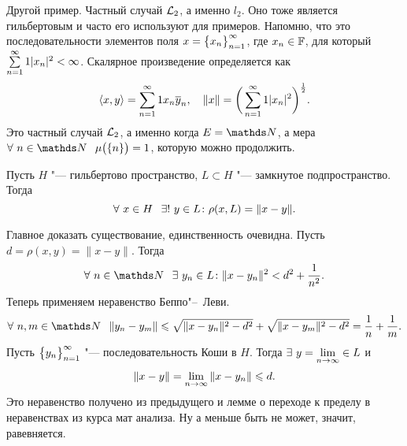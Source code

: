 Другой пример. Частный случай $\mathcal L_2$, а именно $l_2$. Оно тоже является гильбертовым и часто его используют для примеров. Напомню, что это последовательности элементов поля $x = \big\{{x}_{n}\big\}_{n=1}^\infty$, где $x_n\in \mathbb F$, для который $\sum\limits_{{n}={1}}^\infty1|x_n|^2<\infty$. Скалярное произведение определяется как
\[
  \langle x,y\rangle = \sum\limits_{{n}={1}}^\infty1 x_n\overline{y}_n,\quad \|x\| = \bigg(\sum\limits_{{n}={1}}^\infty1|x_n|^2\bigg)^{\frac12}.
\]
Это частный случай $\mathcal L_2$, а именно когда $E=\N$, а мера $\forall\ n\in\N\pau \mu\big(\{n\}\big) = 1$, которую можно продолжить.

\begin{The}
  Пусть $H$ "--- гильбертово пространство, $L\subset H$ "--- замкнутое подпространство. Тогда
\[
  \forall\ x\in H\pau \exists!\ y\in L\colon \rho(x,L) = \|x-y\|.
\]
\end{The}
\begin{Proof}
 Главное доказать существование, единственность очевидна.
 Пусть $d= \rho(x,y) = \|x-y\|$. Тогда
\[
 \forall\ n\in\N\pau \exists\ y_n\in L\colon \|x-y_n\|^2 < d^2+\frac1{n^2}.
\]
Теперь применяем неравенство Беппо"--~Леви.
\[
  \forall\ n,m\in\N\pau \|y_n-y_m\|\le \sqrt{\|x-y_n\|^2-d^2} + \sqrt{\|x-y_m\|^2-d^2} = \frac1n+\frac1m.
\]
Пусть $\big\{{y}_{n}\big\}_{n=1}^\infty$ "--- последовательность Коши в $H$. Тогда $\exists\ y = \lim\limits_{n\rightarrow\infty}\in L$ и 
\[
  \|x-y\| = \lim\limits_{n\rightarrow\infty}\|x-y_n\| \leqslant d.
\]
Это неравенство получено из предыдущего и лемме о переходе к пределу в неравенствах из курса мат анализа. Ну а меньше быть не может, значит, равевняется.
\end{Proof}

